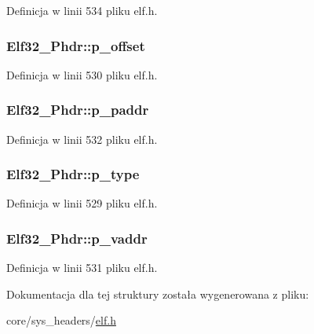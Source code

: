 Definicja w linii 534 pliku elf.\-h.

\hypertarget{struct_elf32___phdr_ac590d4c4b26104216e53058b5b03eef0}{
\subsubsection[{p\-\_\-offset}]{ Elf32\-\_\-\-Phdr\-::p\-\_\-offset}}\label{struct_elf32___phdr_ac590d4c4b26104216e53058b5b03eef0}


Definicja w linii 530 pliku elf.\-h.

\hypertarget{struct_elf32___phdr_af18f0a179a5fca09e3c04bcdce3fac2f}{
\subsubsection[{p\-\_\-paddr}]{ Elf32\-\_\-\-Phdr\-::p\-\_\-paddr}}\label{struct_elf32___phdr_af18f0a179a5fca09e3c04bcdce3fac2f}


Definicja w linii 532 pliku elf.\-h.

\hypertarget{struct_elf32___phdr_a8b1d2942ddb9abcb85db1429b5116923}{
\subsubsection[{p\-\_\-type}]{ Elf32\-\_\-\-Phdr\-::p\-\_\-type}}\label{struct_elf32___phdr_a8b1d2942ddb9abcb85db1429b5116923}


Definicja w linii 529 pliku elf.\-h.

\hypertarget{struct_elf32___phdr_a01a298ebc899bcf9c23211a7bf1155a6}{
\subsubsection[{p\-\_\-vaddr}]{ Elf32\-\_\-\-Phdr\-::p\-\_\-vaddr}}\label{struct_elf32___phdr_a01a298ebc899bcf9c23211a7bf1155a6}


Definicja w linii 531 pliku elf.\-h.



Dokumentacja dla tej struktury została wygenerowana z pliku\-:\begin{DoxyCompactItemize}
\item 
core/sys\-\_\-headers/\hyperlink{elf_8h}{elf.\-h}\end{DoxyCompactItemize}
